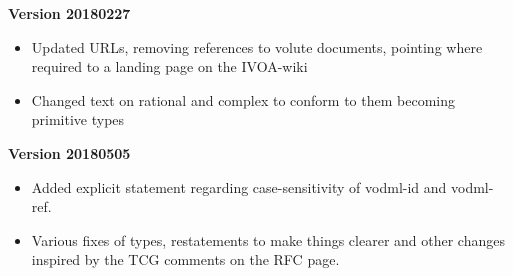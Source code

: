 \documentclass[10pt,a4paper]{ivoa}
\begin{document}
\textbf{Version 20180227}

\begin{itemize}
\item
  Updated URLs, removing references to volute documents, pointing where
  required to a landing page on the IVOA-wiki
\item
  Changed text on rational and complex to conform to them becoming
  primitive types
\end{itemize}

\textbf{Version 20180505}

\begin{itemize}
\item
  Added explicit statement regarding case-sensitivity of vodml-id and
  vodml-ref.
\item
  Various fixes of types, restatements to make things clearer and other
  changes inspired by the TCG comments on the RFC page.
\end{itemize}
\end{document}
